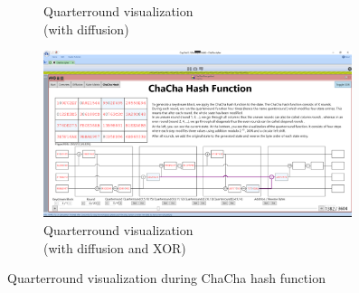 \begin{figure}
\begin{subfigure}[t]{0.5\textwidth}
  \caption{Quarterround visualization\\(with diffusion)}
  \label{fig:chachahash.mid.qr.with.diffusion}
\end{subfigure}%
\begin{subfigure}[t]{0.5\textwidth}
  \centering
  \includegraphics[width=0.99\textwidth]{figures/ct2/chachahash/chachahash-mid-qr-diffusion-xor.png}
  \caption{Quarterround visualization\\(with diffusion and XOR)}
\label{fig:chachahash.md.qr.with.diffusion.xor}
\end{subfigure}
\caption[Quarterround visualization]{Quarterround visualization during ChaCha hash function}
\label{fig:chachahash.mid.qr}
\end{figure}

